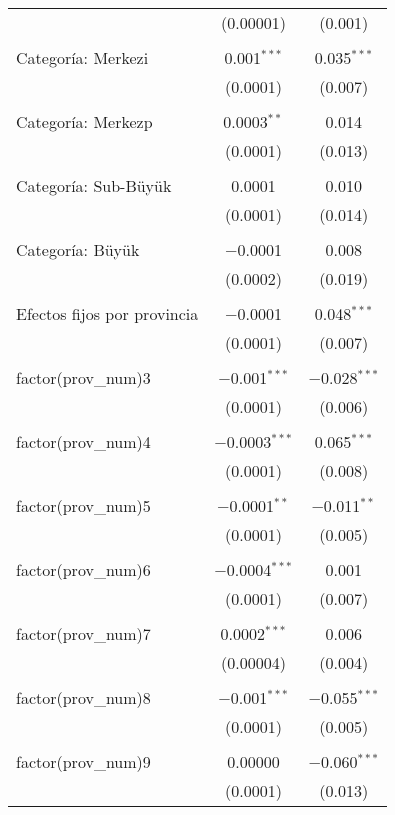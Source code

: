 \begin{table}[ht!]
\begin{tabular}{@{\extracolsep{5pt}}lcc}
  & (0.00001) & (0.001) \\ 
  & & \\ 
 Categoría: Merkezi & 0.001$^{***}$ & 0.035$^{***}$ \\ 
  & (0.0001) & (0.007) \\ 
  & & \\ 
 Categoría: Merkezp & 0.0003$^{**}$ & 0.014 \\ 
  & (0.0001) & (0.013) \\ 
  & & \\ 
 Categoría: Sub-Büyük & 0.0001 & 0.010 \\ 
  & (0.0001) & (0.014) \\ 
  & & \\ 
 Categoría: Büyük & $-$0.0001 & 0.008 \\ 
  & (0.0002) & (0.019) \\ 
  & & \\ 
 Efectos fijos por provincia & $-$0.0001 & 0.048$^{***}$ \\ 
  & (0.0001) & (0.007) \\ 
  & & \\ 
 factor(prov\_num)3 & $-$0.001$^{***}$ & $-$0.028$^{***}$ \\ 
  & (0.0001) & (0.006) \\ 
  & & \\ 
 factor(prov\_num)4 & $-$0.0003$^{***}$ & 0.065$^{***}$ \\ 
  & (0.0001) & (0.008) \\ 
  & & \\ 
 factor(prov\_num)5 & $-$0.0001$^{**}$ & $-$0.011$^{**}$ \\ 
  & (0.0001) & (0.005) \\ 
  & & \\ 
 factor(prov\_num)6 & $-$0.0004$^{***}$ & 0.001 \\ 
  & (0.0001) & (0.007) \\ 
  & & \\ 
 factor(prov\_num)7 & 0.0002$^{***}$ & 0.006 \\ 
  & (0.00004) & (0.004) \\ 
  & & \\ 
 factor(prov\_num)8 & $-$0.001$^{***}$ & $-$0.055$^{***}$ \\ 
  & (0.0001) & (0.005) \\ 
  & & \\ 
 factor(prov\_num)9 & 0.00000 & $-$0.060$^{***}$ \\ 
  & (0.0001) & (0.013) \\ 

\end{tabular}
\end{table}
